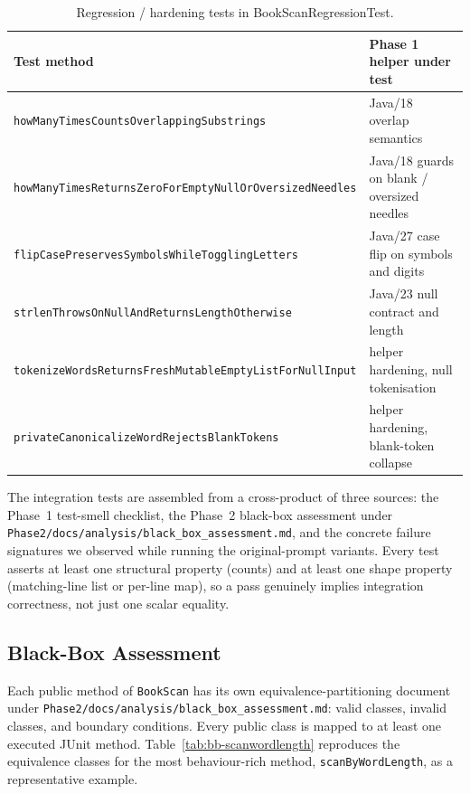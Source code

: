 \documentclass[journal]{IEEEtran}
\begin{document}
\begin{table}[!t]
\renewcommand{\arraystretch}{1.15}
\caption{Regression / hardening tests in BookScanRegressionTest.}
\label{tab:reg-tests}
\centering
\footnotesize
\begin{tabular}{@{}p{3.3cm}p{4.3cm}@{}}
\toprule
\textbf{Test method} & \textbf{Phase 1 helper under test} \\
\midrule
\texttt{howManyTimesCounts}\-\texttt{OverlappingSubstrings} & Java/18 overlap semantics \\
\texttt{howManyTimesReturnsZeroFor}\-\texttt{EmptyNullOrOversizedNeedles} & Java/18 guards on blank / oversized needles \\
\texttt{flipCasePreservesSymbols}\-\texttt{WhileTogglingLetters} & Java/27 case flip on symbols and digits \\
\texttt{strlenThrowsOnNullAnd}\-\texttt{ReturnsLengthOtherwise} & Java/23 null contract and length \\
\texttt{tokenizeWordsReturnsFresh}\-\texttt{MutableEmptyListForNullInput} & helper hardening, null tokenisation \\
\texttt{privateCanonicalizeWord}\-\texttt{RejectsBlankTokens} & helper hardening, blank-token collapse \\
\bottomrule
\end{tabular}
\end{table}

The integration tests are assembled from a cross-product of three sources:
the Phase~1 test-smell checklist, the Phase~2 black-box assessment under
\texttt{Phase2/docs/analysis/black\_box\_assessment.md}, and the concrete
failure signatures we observed while running the original-prompt variants.
Every test asserts at least one structural property (counts) and at least
one shape property (matching-line list or per-line map), so a pass
genuinely implies integration correctness, not just one scalar equality.

\subsection{Black-Box Assessment}

Each public method of \texttt{BookScan} has its own
equivalence-partitioning document under
\texttt{Phase2/docs/analysis/black\_box\_assessment.md}: valid classes,
invalid classes, and boundary conditions. Every public class is mapped to
at least one executed JUnit method. Table~\ref{tab:bb-scanwordlength}
reproduces the equivalence classes for the most behaviour-rich method,
\texttt{scanByWordLength}, as a representative example.
\end{document}
